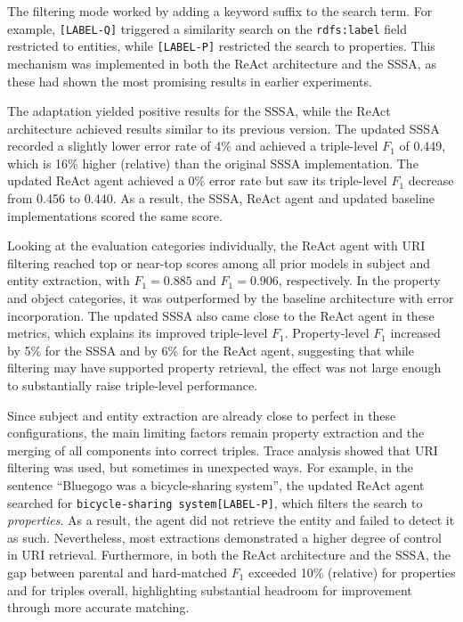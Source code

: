 \documentclass[a4paper,oneside,bibliography=totoc]{scrbook}
\begin{document}
The filtering mode worked by adding a keyword suffix to the search term. For example, \texttt{[LABEL-Q]} triggered a similarity search on the \texttt{rdfs:label} field restricted to entities, while \texttt{[LABEL-P]} restricted the search to properties. This mechanism was implemented in both the ReAct architecture and the \ac{SSSA}, as these had shown the most promising results in earlier experiments.

The adaptation yielded positive results for the \ac{SSSA}, while the ReAct architecture achieved results similar to its previous version. The updated \ac{SSSA} recorded a slightly lower error rate of 4\% and achieved a triple-level $F_{1}$ of 0.449, which is 16\% higher (relative) than the original \ac{SSSA} implementation. The updated ReAct agent achieved a 0\% error rate but saw its triple-level $F_{1}$ decrease from 0.456 to 0.440. As a result, the \ac{SSSA}, ReAct agent and updated baseline implementations scored the same score.

Looking at the evaluation categories individually, the ReAct agent with URI filtering reached top or near-top scores among all prior models in subject and entity extraction, with $F_{1}=0.885$ and $F_{1}=0.906$, respectively. In the property and object categories, it was outperformed by the baseline architecture with error incorporation. The updated \ac{SSSA} also came close to the ReAct agent in these metrics, which explains its improved triple-level $F_{1}$. Property-level $F_{1}$ increased by 5\% for the \ac{SSSA} and by 6\% for the ReAct agent, suggesting that while filtering may have supported property retrieval, the effect was not large enough to substantially raise triple-level performance.

Since subject and entity extraction are already close to perfect in these configurations, the main limiting factors remain property extraction and the merging of all components into correct triples. Trace analysis showed that URI filtering was used, but sometimes in unexpected ways. For example, in the sentence \enquote{Bluegogo was a bicycle-sharing system}, the updated ReAct agent searched for \texttt{bicycle-sharing system[LABEL-P]}, which filters the search to \textit{properties}. As a result, the agent did not retrieve the entity and failed to detect it as such. Nevertheless, most extractions demonstrated a higher degree of control in URI retrieval. Furthermore, in both the ReAct architecture and the \ac{SSSA}, the gap between parental and hard-matched $F_{1}$ exceeded 10\% (relative) for properties and for triples overall, highlighting substantial headroom for improvement through more accurate matching.
\end{document}
